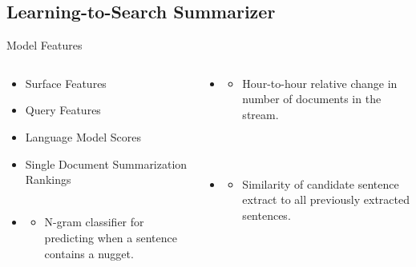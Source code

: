 \subsection{Learning-to-Search Summarizer}

\begin{frame}{Model Features}
  \begin{columns}
      \begin{column}{.5\textwidth}
      \begin{itemize}
        \item Surface Features
        \item Query Features
        \item Language Model Scores
        \item Single Document Summarization Rankings\\~\\ %
        \item {} 
            \begin{itemize}
                \item<2->  N-gram classifier for 
                    predicting when a sentence contains a nugget.
            \end{itemize}
      \end{itemize}
    \end{column}
    \begin{column}{.5\textwidth}
      \begin{itemize}
          \item {}
            \begin{itemize} %
                \item<3-> Hour-to-hour relative change in number of documents 
                    in the stream.
            \end{itemize}~\\~\\
        \item {}
             \begin{itemize}
                \item<4-> Similarity of candidate sentence extract to all 
                    previously extracted sentences.
             \end{itemize}
      \end{itemize}
   \end{column}
  \end{columns}
\end{frame}




